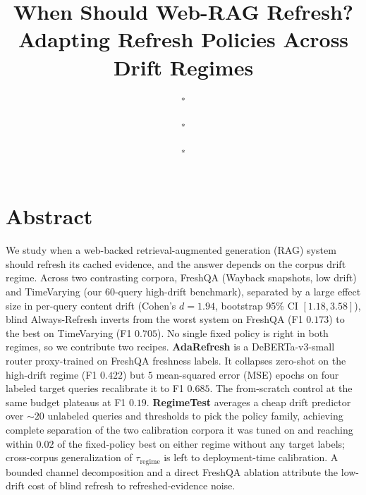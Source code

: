 \documentclass[pdflatex,sn-basic]{sn-jnl}
\begin{document}
\title[When Should Web-RAG Refresh?]{When Should Web-RAG Refresh? Adapting Refresh Policies Across Drift Regimes}

\author[1]{ \textsuperscript{*}}
\author[1]{ \textsuperscript{*}}
\author[2]{ \textsuperscript{*}}
\author[3]{ }
\author[4]{ }
\author[1]{ }
\author[1]{ \textsuperscript{\dag}}


\maketitle

\section*{Abstract}
We study when a web-backed retrieval-augmented generation (RAG) system should refresh its cached evidence, and the answer depends on the corpus drift regime. Across two contrasting corpora, FreshQA (Wayback snapshots, low drift) and TimeVarying (our 60-query high-drift benchmark), separated by a large effect size in per-query content drift (Cohen's $d{=}1.94$, bootstrap 95\% CI $[1.18, 3.58]$), blind Always-Refresh inverts from the worst system on FreshQA (F1 $0.173$) to the best on TimeVarying (F1 $0.705$). No single fixed policy is right in both regimes, so we contribute two recipes. \textbf{AdaRefresh} is a DeBERTa-v3-small router proxy-trained on FreshQA freshness labels. It collapses zero-shot on the high-drift regime (F1 $0.422$) but $5$ mean-squared error (MSE) epochs on four labeled target queries recalibrate it to F1 $0.685$. The from-scratch control at the same budget plateaus at F1 $0.19$. \textbf{RegimeTest} averages a cheap drift predictor over ${\sim}20$ unlabeled queries and thresholds to pick the policy family, achieving complete separation of the two calibration corpora it was tuned on and reaching within $0.02$ of the fixed-policy best on either regime without any target labels; cross-corpus generalization of $\tau_{\text{regime}}$ is left to deployment-time calibration. A bounded channel decomposition and a direct FreshQA ablation attribute the low-drift cost of blind refresh to refreshed-evidence noise.
\end{document}
